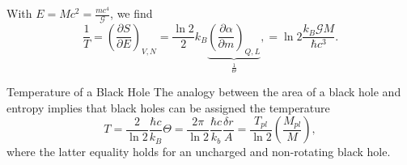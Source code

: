 	With $E=Mc^2= \frac{m c^4}{\mathcal{G}}$, we find 
	\begin{equation}
		\frac{1}{T} = \left(\frac{\partial S}{\partial E}\right)_{V,N} = \frac{\ln 2}{2} k_B \underbrace{\left(\frac{\partial \alpha}{\partial m}\right)_{Q,L}}_{\frac{1}{\Theta}},= \ln 2 \frac{k_B \mathcal{G} M}{\hbar c^3}.
	\end{equation}
\begin{mybox}{Temperature of a Black Hole}
The analogy between the area of a black hole and entropy implies that
black holes can be assigned the temperature
\begin{equation}
	T = \frac{2}{\ln 2} \frac{\hbar c}{k_B} \Theta= \frac{2 \pi}{\ln 2} \frac{\hbar c}{k_b} \frac{\delta r}{A} = \frac{T_{pl}}{\ln 2} \left(\frac{M_{pl}}{M}\right),
\end{equation}
where the latter equality holds for an uncharged and non-rotating black hole.
\end{mybox}
	
